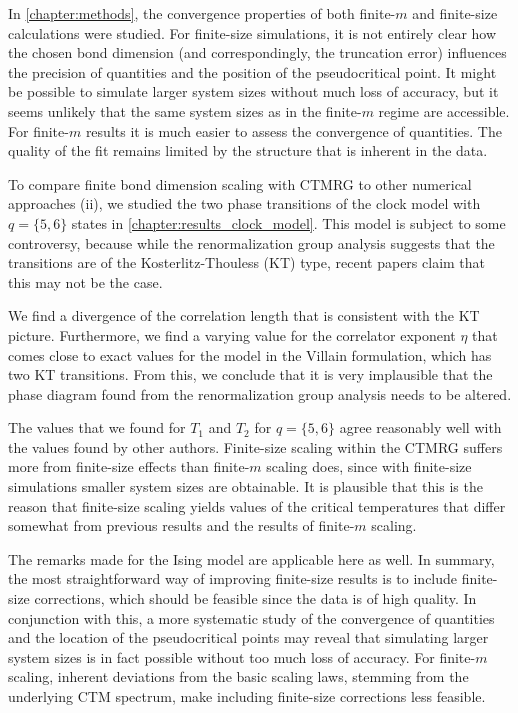 In \autoref{chapter:methods}, the convergence properties of both finite-$m$ and finite-size calculations were studied.
For finite-size simulations, it is not entirely clear how the chosen bond dimension (and correspondingly,
the truncation error) influences the precision of quantities and the position of the pseudocritical point.
It might be possible to simulate larger system sizes without much loss of accuracy,
but it seems unlikely that the same system sizes as in the finite-$m$ regime are accessible.
For finite-$m$ results it is much easier to assess the convergence of quantities.
The quality of the fit remains limited by the structure that is inherent in the data.

To compare finite bond dimension scaling with CTMRG to other numerical approaches (ii),
we studied the two phase transitions of the clock model with $q = \{5,
6\}$ states in \autoref{chapter:results_clock_model}.
This model is subject to some controversy, because while the renormalization group analysis suggests that the
transitions are of the Kosterlitz-Thouless (KT) type, recent papers claim that this may not be the case.

We find a divergence of the correlation length that is consistent with the KT picture.
Furthermore, we find a varying value for the correlator exponent $\eta$ that comes close to exact values for the model
in the Villain formulation, which has two KT transitions.
From this, we conclude that it is very implausible that the phase diagram
found from the renormalization group analysis needs to be altered.

The values that we found for $T_1$ and $T_2$ for $q = \{ 5, 6 \}$ agree reasonably well with the values found by
other authors.
Finite-size scaling within the CTMRG suffers more from finite-size effects than finite-$m$ scaling does,
since with finite-size simulations smaller system sizes are obtainable.
It is plausible that this is the reason that finite-size scaling yields values of the critical temperatures that differ
somewhat from previous results and the results of finite-$m$ scaling.



The remarks made for the Ising model are applicable here as well. In summary,
the most straightforward way of improving finite-size results is to include finite-size corrections,
which should be feasible since the data is of high quality.
In conjunction with this, a more systematic study of the convergence of quantities and the location of the
pseudocritical points may reveal that
simulating larger system sizes is in fact possible without too much loss of accuracy.
For finite-$m$ scaling, inherent deviations from the basic scaling laws, stemming from the underlying CTM spectrum, make
including finite-size corrections less feasible.

